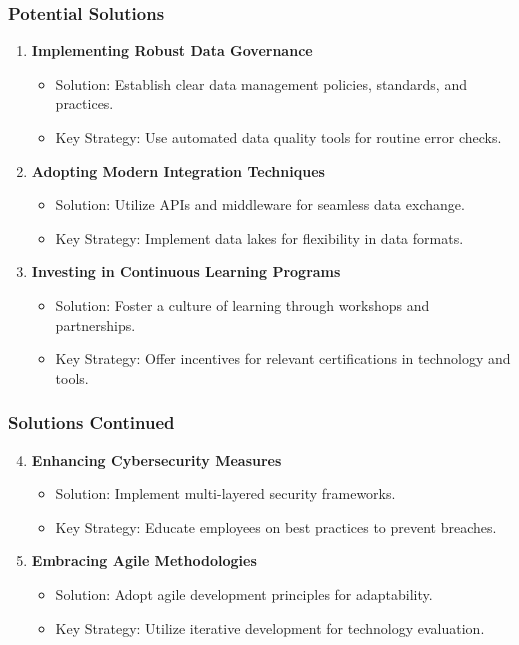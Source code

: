 \documentclass{beamer}
\begin{document}
\begin{frame}[fragile]
    \frametitle{Potential Solutions}
    \begin{enumerate}
        \item \textbf{Implementing Robust Data Governance}
        \begin{itemize}
            \item Solution: Establish clear data management policies, standards, and practices.
            \item Key Strategy: Use automated data quality tools for routine error checks.
        \end{itemize}

        \item \textbf{Adopting Modern Integration Techniques}
        \begin{itemize}
            \item Solution: Utilize APIs and middleware for seamless data exchange.
            \item Key Strategy: Implement data lakes for flexibility in data formats.
        \end{itemize}

        \item \textbf{Investing in Continuous Learning Programs}
        \begin{itemize}
            \item Solution: Foster a culture of learning through workshops and partnerships.
            \item Key Strategy: Offer incentives for relevant certifications in technology and tools.
        \end{itemize}
    \end{enumerate}
\end{frame}

\begin{frame}[fragile]
    \frametitle{Solutions Continued}
    \begin{enumerate}
        \setcounter{enumi}{3}
        \item \textbf{Enhancing Cybersecurity Measures}
        \begin{itemize}
            \item Solution: Implement multi-layered security frameworks.
            \item Key Strategy: Educate employees on best practices to prevent breaches.
        \end{itemize}

        \item \textbf{Embracing Agile Methodologies}
        \begin{itemize}
            \item Solution: Adopt agile development principles for adaptability.
            \item Key Strategy: Utilize iterative development for technology evaluation.
        \end{itemize}
    \end{enumerate}
\end{frame}
\end{document}
